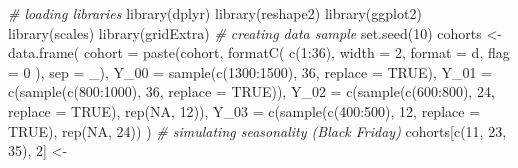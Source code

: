 \documentclass[
]{book}
\newenvironment{Shaded}{\begin{snugshade}}{\end{snugshade}}
\newcommand{\AttributeTok}[1]{\textcolor[rgb]{0.77,0.63,0.00}{#1}}
\newcommand{\CommentTok}[1]{\textcolor[rgb]{0.56,0.35,0.01}{\textit{#1}}}
\newcommand{\ConstantTok}[1]{\textcolor[rgb]{0.00,0.00,0.00}{#1}}
\newcommand{\DecValTok}[1]{\textcolor[rgb]{0.00,0.00,0.81}{#1}}
\newcommand{\FunctionTok}[1]{\textcolor[rgb]{0.00,0.00,0.00}{#1}}
\newcommand{\NormalTok}[1]{#1}
\newcommand{\OtherTok}[1]{\textcolor[rgb]{0.56,0.35,0.01}{#1}}
\newcommand{\SpecialCharTok}[1]{\textcolor[rgb]{0.00,0.00,0.00}{#1}}
\newcommand{\StringTok}[1]{\textcolor[rgb]{0.31,0.60,0.02}{#1}}
\begin{document}
\begin{Shaded}
\begin{Highlighting}[]
\CommentTok{\# loading libraries}
\FunctionTok{library}\NormalTok{(dplyr)}
\FunctionTok{library}\NormalTok{(reshape2)}
\FunctionTok{library}\NormalTok{(ggplot2)}
\FunctionTok{library}\NormalTok{(scales)}
\FunctionTok{library}\NormalTok{(gridExtra)}
\CommentTok{\# creating data sample}
\FunctionTok{set.seed}\NormalTok{(}\DecValTok{10}\NormalTok{)}
\NormalTok{cohorts }\OtherTok{\textless{}{-}}
    \FunctionTok{data.frame}\NormalTok{(}
        \AttributeTok{cohort =} \FunctionTok{paste}\NormalTok{(}\StringTok{\textquotesingle{}cohort\textquotesingle{}}\NormalTok{, }\FunctionTok{formatC}\NormalTok{(}
            \FunctionTok{c}\NormalTok{(}\DecValTok{1}\SpecialCharTok{:}\DecValTok{36}\NormalTok{),}
            \AttributeTok{width =} \DecValTok{2}\NormalTok{,}
            \AttributeTok{format =} \StringTok{\textquotesingle{}d\textquotesingle{}}\NormalTok{,}
            \AttributeTok{flag =} \StringTok{\textquotesingle{}0\textquotesingle{}}
\NormalTok{        ), }\AttributeTok{sep =} \StringTok{\textquotesingle{}\_\textquotesingle{}}\NormalTok{),}
        \AttributeTok{Y\_00 =} \FunctionTok{sample}\NormalTok{(}\FunctionTok{c}\NormalTok{(}\DecValTok{1300}\SpecialCharTok{:}\DecValTok{1500}\NormalTok{), }\DecValTok{36}\NormalTok{, }\AttributeTok{replace =} \ConstantTok{TRUE}\NormalTok{),}
        \AttributeTok{Y\_01 =} \FunctionTok{c}\NormalTok{(}\FunctionTok{sample}\NormalTok{(}\FunctionTok{c}\NormalTok{(}\DecValTok{800}\SpecialCharTok{:}\DecValTok{1000}\NormalTok{), }\DecValTok{36}\NormalTok{, }\AttributeTok{replace =} \ConstantTok{TRUE}\NormalTok{)),}
        \AttributeTok{Y\_02 =} \FunctionTok{c}\NormalTok{(}\FunctionTok{sample}\NormalTok{(}\FunctionTok{c}\NormalTok{(}\DecValTok{600}\SpecialCharTok{:}\DecValTok{800}\NormalTok{), }\DecValTok{24}\NormalTok{, }\AttributeTok{replace =} \ConstantTok{TRUE}\NormalTok{), }\FunctionTok{rep}\NormalTok{(}\ConstantTok{NA}\NormalTok{, }\DecValTok{12}\NormalTok{)),}
        \AttributeTok{Y\_03 =} \FunctionTok{c}\NormalTok{(}\FunctionTok{sample}\NormalTok{(}\FunctionTok{c}\NormalTok{(}\DecValTok{400}\SpecialCharTok{:}\DecValTok{500}\NormalTok{), }\DecValTok{12}\NormalTok{, }\AttributeTok{replace =} \ConstantTok{TRUE}\NormalTok{), }\FunctionTok{rep}\NormalTok{(}\ConstantTok{NA}\NormalTok{, }\DecValTok{24}\NormalTok{))}
\NormalTok{    )}
\CommentTok{\# simulating seasonality (Black Friday)}
\NormalTok{cohorts[}\FunctionTok{c}\NormalTok{(}\DecValTok{11}\NormalTok{, }\DecValTok{23}\NormalTok{, }\DecValTok{35}\NormalTok{), }\DecValTok{2}\NormalTok{] }\OtherTok{\textless{}{-}}

\end{Highlighting}
\end{Shaded}
\end{document}
